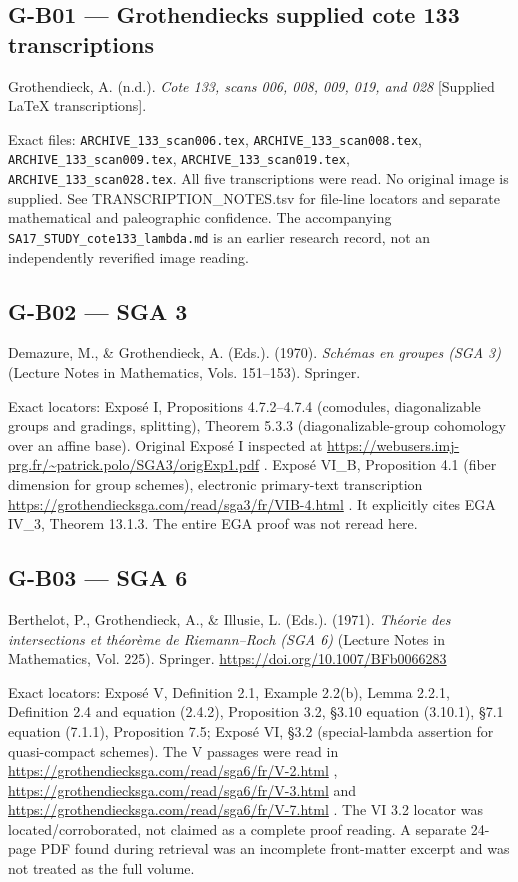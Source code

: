 \documentclass[11pt,a4paper]{article}
\theoremstyle{definition}\newtheorem{definition}{Definition}
\begin{document}
\subsection{G-B01 --- Grothendieck\textquotesingle s supplied cote 133
transcriptions}\label{g-b01--grothendiecks-supplied-cote-133-transcriptions}

Grothendieck, A. (n.d.). \emph{Cote 133, scans 006, 008, 009, 019, and
028} {[}Supplied LaTeX transcriptions{]}.

Exact files: \nolinkurl{ARCHIVE_133_scan006.tex},
\nolinkurl{ARCHIVE_133_scan008.tex}, \nolinkurl{ARCHIVE_133_scan009.tex},
\nolinkurl{ARCHIVE_133_scan019.tex}, \nolinkurl{ARCHIVE_133_scan028.tex}.
All five transcriptions were read. No original image is supplied. See
TRANSCRIPTION\_NOTES.tsv for file-line locators and separate
mathematical and paleographic confidence. The accompanying
\nolinkurl{SA17_STUDY_cote133_lambda.md} is an earlier research record,
not an independently reverified image reading.

\subsection{G-B02 --- SGA 3}\label{g-b02--sga-3}

Demazure, M., \& Grothendieck, A. (Eds.). (1970). \emph{Schémas en
groupes (SGA 3)} (Lecture Notes in Mathematics, Vols. 151--153).
Springer.

Exact locators: Exposé I, Propositions 4.7.2--4.7.4 (comodules,
diagonalizable groups and gradings, splitting), Theorem 5.3.3
(diagonalizable-group cohomology over an affine base). Original Exposé I
inspected at
\url{https://webusers.imj-prg.fr/~patrick.polo/SGA3/origExp1.pdf} .
Exposé VI\_B, Proposition 4.1 (fiber dimension for group schemes),
electronic primary-text transcription
\url{https://grothendiecksga.com/read/sga3/fr/VIB-4.html} . It
explicitly cites EGA IV\_3, Theorem 13.1.3. The entire EGA proof was not
reread here.

\subsection{G-B03 --- SGA 6}\label{g-b03--sga-6}

Berthelot, P., Grothendieck, A., \& Illusie, L. (Eds.). (1971).
\emph{Théorie des intersections et théorème de Riemann--Roch (SGA 6)}
(Lecture Notes in Mathematics, Vol. 225). Springer.
\url{https://doi.org/10.1007/BFb0066283}

Exact locators: Exposé V, Definition 2.1, Example 2.2(b), Lemma 2.2.1,
Definition 2.4 and equation (2.4.2), Proposition 3.2, §3.10 equation
(3.10.1), §7.1 equation (7.1.1), Proposition 7.5; Exposé VI, §3.2
(special-lambda assertion for quasi-compact schemes). The V passages
were read in \url{https://grothendiecksga.com/read/sga6/fr/V-2.html} ,
\url{https://grothendiecksga.com/read/sga6/fr/V-3.html} and
\url{https://grothendiecksga.com/read/sga6/fr/V-7.html} . The VI 3.2
locator was located/corroborated, not claimed as a complete proof
reading. A separate 24-page PDF found during retrieval was an incomplete
front-matter excerpt and was not treated as the full volume.
\end{document}
